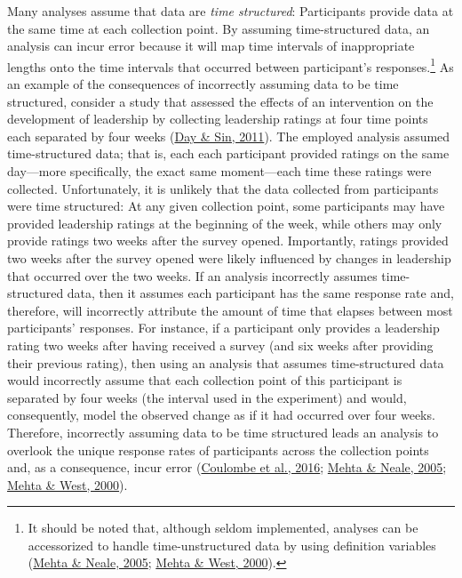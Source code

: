 \documentclass[
12pt, %
twoside,
english]{guelphthesis}
\begin{document}
Many analyses assume that data are \emph{time structured}: Participants provide data at the same time at each collection point. By assuming time-structured data, an analysis can incur error because it will map time intervals of inappropriate lengths onto the time intervals that occurred between participant's responses.\footnote{It should be noted that, although seldom implemented, analyses can be accessorized to handle time-unstructured data by using definition variables (\protect\hyperlink{ref-mehta2005}{Mehta \& Neale, 2005}; \protect\hyperlink{ref-mehta2000}{Mehta \& West, 2000}).} As an example of the consequences of incorrectly assuming data to be time structured, consider a study that assessed the effects of an intervention on the development of leadership by collecting leadership ratings at four time points each separated by four weeks (\protect\hyperlink{ref-day2011}{Day \& Sin, 2011}). The employed analysis assumed time-structured data; that is, each each participant provided ratings on the same day---more specifically, the exact same moment---each time these ratings were collected. Unfortunately, it is unlikely that the data collected from participants were time structured: At any given collection point, some participants may have provided leadership ratings at the beginning of the week, while others may only provide ratings two weeks after the survey opened. Importantly, ratings provided two weeks after the survey opened were likely influenced by changes in leadership that occurred over the two weeks. If an analysis incorrectly assumes time-structured data, then it assumes each participant has the same response rate and, therefore, will incorrectly attribute the amount of time that elapses between most participants' responses. For instance, if a participant only provides a leadership rating two weeks after having received a survey (and six weeks after providing their previous rating), then using an analysis that assumes time-structured data would incorrectly assume that each collection point of this participant is separated by four weeks (the interval used in the experiment) and would, consequently, model the observed change as if it had occurred over four weeks. Therefore, incorrectly assuming data to be time structured leads an analysis to overlook the unique response rates of participants across the collection points and, as a consequence, incur error (\protect\hyperlink{ref-coulombe2016}{Coulombe et al., 2016}; \protect\hyperlink{ref-mehta2005}{Mehta \& Neale, 2005}; \protect\hyperlink{ref-mehta2000}{Mehta \& West, 2000}).
\end{document}
